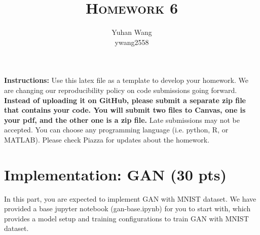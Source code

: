 \documentclass[a4paper]{article}
\title{\textsc{Homework 6}} %
\author{
	Yuhan Wang \\
	ywang2558 \\
}
\date{}
\theoremstyle{definition}
\begin{document}
	
	\maketitle 
	
        \textbf{Instructions:}
        Use this latex file as a template to develop your homework. We are changing our reproducibility policy on code submissions going forward. \textbf{Instead of uploading it on GitHub, please submit a separate zip file that contains your code. You will submit two files to Canvas, one is your pdf, and the other one is a zip file.} Late submissions may not be accepted. You can choose any programming language (i.e. python, R, or MATLAB). Please check Piazza for updates about the homework.
        \vspace{0.1in}
	
	\section{Implementation: GAN (30 pts)}
	In this part, you are expected to implement GAN with MNIST dataset. We have provided a base jupyter notebook (gan-base.ipynb) for you to start with, which provides a model setup and training configurations to train GAN with MNIST dataset.
	
\end{document}
